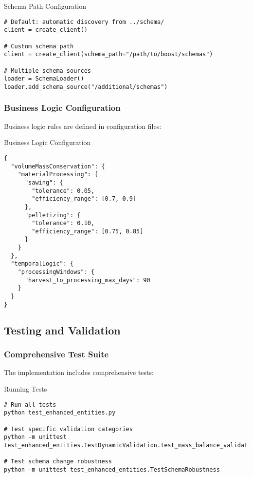 \begin{pythonexample}{Schema Path Configuration}
\begin{verbatim}
# Default: automatic discovery from ../schema/
client = create_client()

# Custom schema path
client = create_client(schema_path="/path/to/boost/schemas")

# Multiple schema sources
loader = SchemaLoader()
loader.add_schema_source("/additional/schemas")
\end{verbatim}
\end{pythonexample}

\subsubsection{Business Logic Configuration}
\label{sec:python-business-config}

Business logic rules are defined in configuration files:

\begin{jsonexample}{Business Logic Configuration}
\begin{verbatim}
{
  "volumeMassConservation": {
    "materialProcessing": {
      "sawing": {
        "tolerance": 0.05,
        "efficiency_range": [0.7, 0.9]
      },
      "pelletizing": {
        "tolerance": 0.10,
        "efficiency_range": [0.75, 0.85]
      }
    }
  },
  "temporalLogic": {
    "processingWindows": {
      "harvest_to_processing_max_days": 90
    }
  }
}
\end{verbatim}
\end{jsonexample}

\subsection{Testing and Validation}
\label{sec:python-testing}

\subsubsection{Comprehensive Test Suite}
\label{sec:python-test-suite}

The implementation includes comprehensive tests:

\begin{pythonexample}{Running Tests}
\begin{verbatim}
# Run all tests
python test_enhanced_entities.py

# Test specific validation categories
python -m unittest test_enhanced_entities.TestDynamicValidation.test_mass_balance_validation

# Test schema change robustness
python -m unittest test_enhanced_entities.TestSchemaRobustness
\end{verbatim}
\end{pythonexample}

